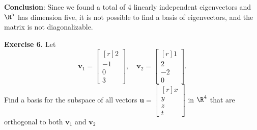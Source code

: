\documentclass[12pt]{article}
\begin{document}
\textbf{Conclusion}: Since we found a total of 4 linearly independent eigenvectors and $\R^5$ has dimension five, it is not possible to find a basis of eigenvectors, and the matrix is not diagonalizable. 
\proofend

\bigskip
\textbf{Exercise 6.} Let
\[
\mathbf{v}_1=\begin{bmatrix*}[r]2\\-1\\0\\3\end{bmatrix*},\quad
\mathbf{v}_2=\begin{bmatrix*}[r]1\\2\\-2\\0\end{bmatrix*}.
\]
Find a basis for the subspace of all vectors $\mathbf{u}=\begin{bmatrix*}[r]x\\y\\z\\t\end{bmatrix*}$ in $\R^4$ that are orthogonal to both $\mathbf{v}_1$ and $\mathbf{v}_2$
\end{document}
